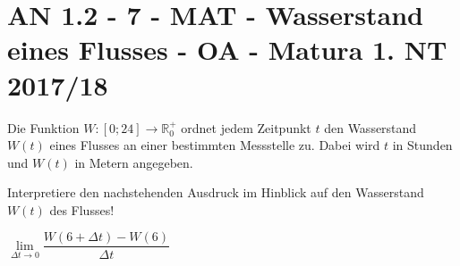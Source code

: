 \section{AN 1.2 - 7 - MAT - Wasserstand eines Flusses - OA - Matura 1. NT 2017/18}

\begin{beispiel}[AN 1.2]{1}
Die Funktion $W\!:[0;24]\rightarrow\mathbb{R}^+_0$ ordnet jedem Zeitpunkt $t$ den Wasserstand $W(t)$ eines Flusses an einer bestimmten Messstelle zu. Dabei wird $t$ in Stunden und $W(t)$ in Metern angegeben.

Interpretiere den nachstehenden Ausdruck im Hinblick auf den Wasserstand $W(t)$ des Flusses!\leer

$\lim\limits_{\Delta t\rightarrow 0}\dfrac{W(6+\Delta t)-W(6)}{\Delta t}$

\end{beispiel}